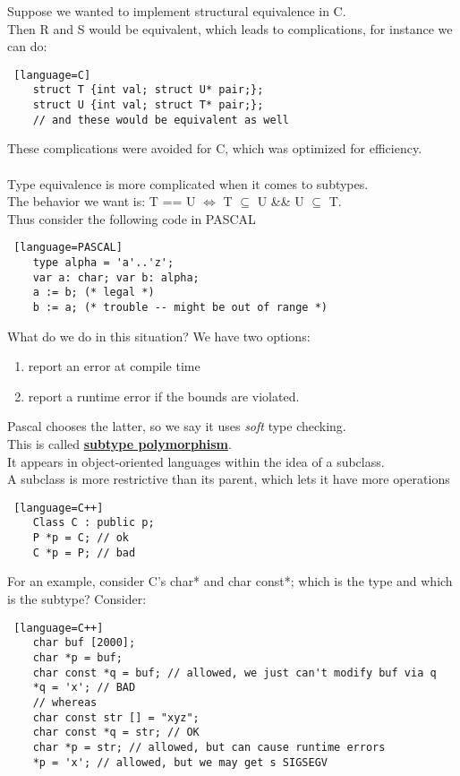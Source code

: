 \documentclass[../../lecture_notes.tex]{subfiles}
\begin{document}
\noindent Suppose we wanted to implement structural equivalence in C.\\
Then R and S would be equivalent, which leads to complications, for instance we can do:
\begin{lstlisting} [language=C]
	struct T {int val; struct U* pair;};
	struct U {int val; struct T* pair;};
	// and these would be equivalent as well
\end{lstlisting}
These complications were avoided for C, which was optimized for efficiency.\\
\\
Type equivalence is more complicated when it comes to subtypes.\\
The behavior we want is: T == U $\iff$ T $\subseteq$ U \&\& U $\subseteq$ T.\\
Thus consider the following code in PASCAL
\begin{lstlisting} [language=PASCAL]
	type alpha = 'a'..'z';
	var a: char; var b: alpha;
	a := b; (* legal *)
	b := a; (* trouble -- might be out of range *)
\end{lstlisting}
What do we do in this situation?  We have two options:
\begin{enumerate} [itemsep=0mm]
	\item report an error at compile time
	\item report a runtime error if the bounds are violated.
\end{enumerate}
Pascal chooses the latter, so we say it uses \textit{soft} type checking.\\
This is called \textbf{\underline{subtype polymorphism}}.\\
It appears in object-oriented languages within the idea of a subclass.\\
A subclass is more restrictive than its parent, which lets it have more operations
\begin{lstlisting} [language=C++]
	Class C : public p;
	P *p = C; // ok
	C *p = P; // bad
\end{lstlisting}
For an example, consider C's char* and char const*; which is the type and which is the subtype? Consider:
\begin{lstlisting} [language=C++]
	char buf [2000];
	char *p = buf;
	char const *q = buf; // allowed, we just can't modify buf via q
	*q = 'x'; // BAD
	// whereas
	char const str [] = "xyz";
	char const *q = str; // OK
	char *p = str; // allowed, but can cause runtime errors
	*p = 'x'; // allowed, but we may get s SIGSEGV
\end{lstlisting}
\end{document}
